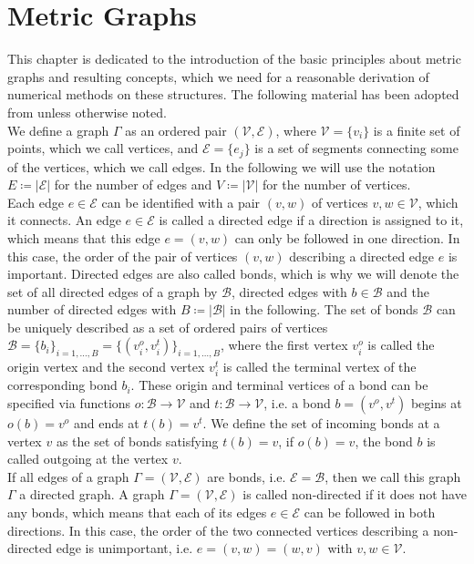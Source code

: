 \section{Metric Graphs}
\label{ch1:sec1}

This chapter is dedicated to the introduction of the basic principles about metric graphs and resulting concepts, which we need for a reasonable derivation of numerical methods on these structures. The following material has been adopted from \cite[chapter~1]{BerkolaikoKuchment:2013} unless otherwise noted. \\

We define a graph $\Gamma$ as an ordered pair $(\mathcal{V}, \mathcal{E})$, where $\mathcal{V} = \{v_i\}$ is a finite set of points, which we call vertices, and $\mathcal{E} = \{e_j\}$ is a set of segments connecting some of the vertices, which we call edges. In the following we will use the notation $E \coloneqq \left\lvert \mathcal{E} \right\rvert$ for the number of edges and $V \coloneqq \left\lvert \mathcal{V} \right\rvert$ for the number of vertices. \\
Each edge $e \in \mathcal{E}$ can be identified with a pair $(v, w)$ of vertices $v, w \in \mathcal{V}$, which it connects. An edge $e \in \mathcal{E}$ is called a directed edge if a direction is assigned to it, which means that this edge $e = (v, w)$ can only be followed in one direction. In this case, the order of the pair of vertices $(v, w)$ describing a directed edge $e$ is important. Directed edges are also called bonds, which is why we will denote the set of all directed edges of a graph by $\mathcal{B}$, directed edges with $b \in \mathcal{B}$ and the number of directed edges with $B \coloneqq \left\lvert \mathcal{B} \right\rvert$ in the following. The set of bonds $\mathcal{B}$ can be uniquely described as a set of ordered pairs of vertices $\mathcal{B} = \{b_i\}_{i = 1, \ldots, B} = \{(v^{o}_{i}, v^{t}_{i})\}_{i = 1, \ldots, B}$, where the first vertex $v^{o}_{i}$ is called the origin vertex and the second vertex $v^{t}_{i}$ is called the terminal vertex of the corresponding bond $b_i$. These origin and terminal vertices of a bond can be specified via functions $o \colon \mathcal{B} \to \mathcal{V}$ and $t \colon \mathcal{B} \to \mathcal{V}$, i.e. a bond $b = (v^{o}, v^{t})$ begins at $o(b) = v^{o}$ and ends at $t(b) = v^{t}$. We define the set of incoming bonds at a vertex $v$ as the set of bonds satisfying $t(b) = v$, if $o(b) = v$, the bond $b$ is called outgoing at the vertex $v$. \\
If all edges of a graph $\Gamma = (\mathcal{V}, \mathcal{E})$ are bonds, i.e. $\mathcal{E} = \mathcal{B}$, then we call this graph $\Gamma$ a directed graph. A graph $\Gamma = (\mathcal{V}, \mathcal{E})$ is called non-directed if it does not have any bonds, which means that each of its edges $e \in \mathcal{E}$ can be followed in both directions. In this case, the order of the two connected vertices describing a non-directed edge is unimportant, i.e. $e = (v, w) = (w, v)$ with $v, w \in \mathcal{V}$. \\
